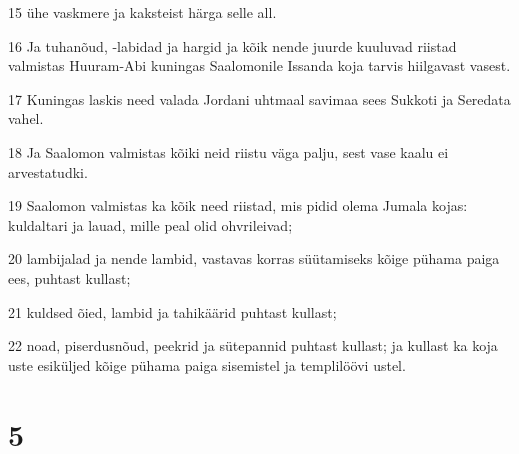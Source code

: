 \par 15 ühe vaskmere ja kaksteist härga selle all.
\par 16 Ja tuhanõud, -labidad ja hargid ja kõik nende juurde kuuluvad riistad valmistas Huuram-Abi kuningas Saalomonile Issanda koja tarvis hiilgavast vasest.
\par 17 Kuningas laskis need valada Jordani uhtmaal savimaa sees Sukkoti ja Seredata vahel.
\par 18 Ja Saalomon valmistas kõiki neid riistu väga palju, sest vase kaalu ei arvestatudki.
\par 19 Saalomon valmistas ka kõik need riistad, mis pidid olema Jumala kojas: kuldaltari ja lauad, mille peal olid ohvrileivad;
\par 20 lambijalad ja nende lambid, vastavas korras süütamiseks kõige pühama paiga ees, puhtast kullast;
\par 21 kuldsed õied, lambid ja tahikäärid puhtast kullast;
\par 22 noad, piserdusnõud, peekrid ja sütepannid puhtast kullast; ja kullast ka koja uste esiküljed kõige pühama paiga sisemistel ja templilöövi ustel.

\chapter{5}

